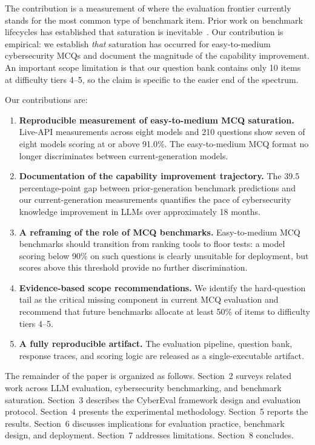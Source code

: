 \documentclass[final]{elsarticle}
\begin{document}
The contribution is a measurement of where the evaluation frontier currently stands for the most common type of benchmark item. Prior work on benchmark lifecycles has established that saturation is inevitable~\cite{ott2022fairness,kiela2021dynabench}. Our contribution is empirical: we establish \emph{that} saturation has occurred for easy-to-medium cybersecurity MCQs and document the magnitude of the capability improvement. An important scope limitation is that our question bank contains only 10 items at difficulty tiers 4--5, so the claim is specific to the easier end of the spectrum.

Our contributions are:

\begin{enumerate}
    \item \textbf{Reproducible measurement of easy-to-medium MCQ saturation.} Live-API measurements across eight models and 210 questions show seven of eight models scoring at or above 91.0\%. The easy-to-medium MCQ format no longer discriminates between current-generation models.
    \item \textbf{Documentation of the capability improvement trajectory.} The 39.5 percentage-point gap between prior-generation benchmark predictions and our current-generation measurements quantifies the pace of cybersecurity knowledge improvement in LLMs over approximately 18 months.
    \item \textbf{A reframing of the role of MCQ benchmarks.} Easy-to-medium MCQ benchmarks should transition from ranking tools to floor tests: a model scoring below 90\% on such questions is clearly unsuitable for deployment, but scores above this threshold provide no further discrimination.
    \item \textbf{Evidence-based scope recommendations.} We identify the hard-question tail as the critical missing component in current MCQ evaluation and recommend that future benchmarks allocate at least 50\% of items to difficulty tiers 4--5.
    \item \textbf{A fully reproducible artifact.} The evaluation pipeline, question bank, response traces, and scoring logic are released as a single-executable artifact.
\end{enumerate}

The remainder of the paper is organized as follows. Section~2 surveys related work across LLM evaluation, cybersecurity benchmarking, and benchmark saturation. Section~3 describes the CyberEval framework design and evaluation protocol. Section~4 presents the experimental methodology. Section~5 reports the results. Section~6 discusses implications for evaluation practice, benchmark design, and deployment. Section~7 addresses limitations. Section~8 concludes.
\end{document}
